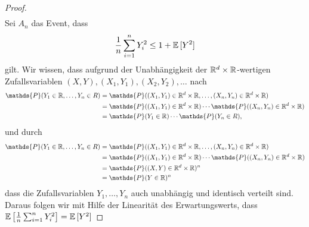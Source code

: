 \begin{proof}
\begin{equation}
\begin{split}
\end{split}
\end{equation}
Sei $A_n$ das Event, dass 
$$\frac{1}{n} \sum_{i = 1}^n Y_i^2 \leq 1 + \mathbb{E}\,[Y^2]$$
gilt.
Wir wissen, dass aufgrund der Unabhängigkeit der $\mathbb{R}^d \times \mathbb{R}$-wertigen Zufallsvariablen  $(X, Y), (X_1, Y_1), (X_2, Y_2), \dots$ nach 
\begin{equation*}
\begin{split}
\mathds{P}(Y_1 \in \R, \dots, Y_n \in R) & = \mathds{P}((X_1, Y_1) \in \R^d \times \R, \dots, (X_n, Y_n) \in \R^d \times \R) \\
& = \mathds{P}((X_1, Y_1) \in \R^d \times \R) \cdots \mathds{P}((X_n, Y_n) \in \R^d \times \R) \\
& = \mathds{P}(Y_1 \in \R) \cdots \mathds{P}(Y_n \in R) ,
\end{split}
\end{equation*}
und durch
\begin{equation*}
\begin{split}
\mathds{P}(Y_1 \in \R, \dots, Y_n \in R) & = \mathds{P}((X_1, Y_1) \in \R^d \times \R, \dots, (X_n, Y_n) \in \R^d \times \R) \\
& = \mathds{P}((X_1, Y_1) \in \R^d \times \R) \cdots \mathds{P}((X_n, Y_n) \in \R^d \times \R) \\
& = \mathds{P}((X, Y) \in \R^d \times \R)^n \\
& = \mathds{P}(Y \in \R)^n
\end{split}
\end{equation*}
dass die Zufallsvariablen $Y_1,\dots,Y_n$ auch unabhängig und identisch verteilt sind. Daraus folgen wir mit Hilfe der Linearität des Erwartungswerts, dass $\mathbb{E}\,\big[\frac{1}{n} \sum_{i = 1}^n Y_i^2\big] = \mathbb{E}\,[Y^2]$ 
\end{proof}